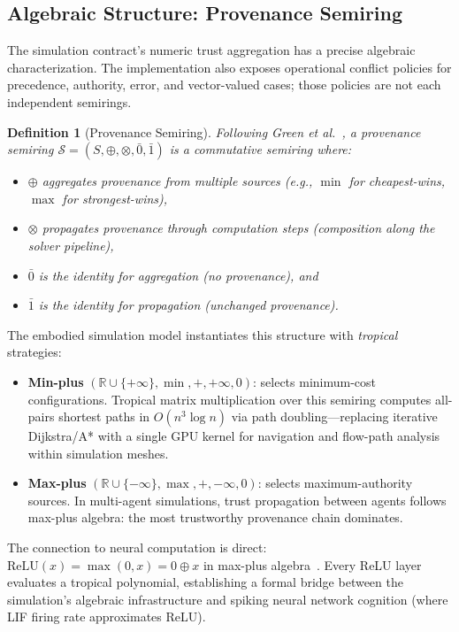 \documentclass[journal]{IEEEtran}
\newtheorem{definition}{Definition}
\begin{document}
\subsection{Algebraic Structure: Provenance Semiring}
\label{sec:model:semiring}

The simulation contract's numeric trust aggregation has a precise algebraic
characterization. The implementation also exposes operational conflict
policies for precedence, authority, error, and vector-valued cases; those
policies are not each independent semirings.

\begin{definition}[Provenance Semiring]
Following Green et al.~\cite{green-semiring2007}, a \emph{provenance semiring}
$\mathcal{S} = (S, \oplus, \otimes, \bar{0},
\bar{1})$ is a commutative semiring where:
\begin{itemize}
  \item $\oplus$ aggregates provenance from multiple sources
    (e.g., $\min$ for cheapest-wins, $\max$ for strongest-wins),
  \item $\otimes$ propagates provenance through computation steps
    (composition along the solver pipeline),
  \item $\bar{0}$ is the identity for aggregation (no provenance), and
  \item $\bar{1}$ is the identity for propagation (unchanged provenance).
\end{itemize}
\end{definition}

The embodied simulation model instantiates this structure with
\emph{tropical} strategies:

\begin{itemize}
  \item \textbf{Min-plus} $(\mathbb{R} \cup \{+\infty\}, \min, +,
    +\infty, 0)$: selects minimum-cost configurations. Tropical matrix
    multiplication over this semiring computes all-pairs shortest paths
    in $O(n^3 \log n)$ via path doubling---replacing iterative
    Dijkstra/A* with a single GPU kernel for navigation and flow-path
    analysis within simulation meshes.
  \item \textbf{Max-plus} $(\mathbb{R} \cup \{-\infty\}, \max, +,
    -\infty, 0)$: selects maximum-authority sources. In multi-agent
    simulations, trust propagation between agents follows max-plus
    algebra: the most trustworthy provenance chain dominates.
\end{itemize}

The connection to neural computation is direct: $\text{ReLU}(x) =
\max(0, x) = 0 \oplus x$ in max-plus algebra~\cite{Zhang2018tropical}.
Every ReLU layer evaluates a tropical polynomial, establishing a formal
bridge between the simulation's algebraic infrastructure and spiking
neural network cognition (where LIF firing rate approximates ReLU).
\end{document}
